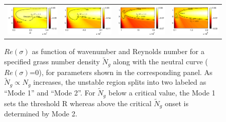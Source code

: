 \documentclass[aps,prl,reprint,twocolumn,showpacs,superscriptaddress,10pt]{revtex4-1}  %
\newcommand{\Rey}{\text{R}}
\newcommand{\Ndg}{\tilde{N}_g}
\begin{document}
\begin{figure}
\begin{tabular}{cccc}
{\includegraphics[scale = 0.67]{Set6_dens32_imgsc}} &
{\includegraphics[scale = 0.67]{Set6_dens34_imgsc}} &
{\includegraphics[scale = 0.67]{Set6_dens36_imgsc}} &
{\includegraphics[scale = 0.67]{Set6_dens38_imgsc}}
\end{tabular}
\caption{$Re(\sigma)$ as function of wavenumber and Reynolds number for a specified grass number density $\Ndg$ along with the neutral curve ($Re(\sigma)$=0), for parameters shown in the corresponding panel.  
As $\Ndg \propto N_g$ increases, the unstable region splits into two labeled as ``Mode 1'' and ``Mode 2''. 
For $\Ndg$ below a critical value, the Mode 1 sets the threshold $\Rey$ whereas above the critical $\Ndg$ onset is determined by Mode 2.}
\label{K_Re_sigma_set3}
\end{figure}
\end{document}
